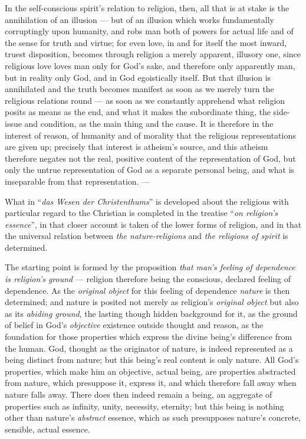 \documentclass[12pt,a4paper]{book}
\begin{document}
In the self-conscious spirit's relation to religion, then, all that is at
stake is the annihilation of an illusion --- but of an illusion which works
fundamentally corruptingly upon humanity, and robs man both of powers for
actual life and of the sense for truth and virtue; for even love, in and for
itself the most inward, truest disposition, becomes through religion a merely
apparent, illusory one, since religious love loves man only for God's sake,
and therefore only apparently man, but in reality only God, and in God
egoistically itself. But that illusion is annihilated and the truth becomes
manifest as soon as we merely turn the religious relations round --- as soon
as we constantly apprehend what religion posits as means as the end, and what
it makes the subordinate thing, the side-issue and condition, as the main
thing and the cause.
It is therefore in the interest of reason, of humanity and of morality that
the religious representations are given up; precisely that interest is
atheism's source, and this atheism therefore negates not the real, positive
content of the representation of God, but only the untrue representation of
God as a separate personal being, and what is inseparable from that
representation. ---

What in ``\emph{das Wesen der Christenthums}'' is
developed about the religious with particular regard to the Christian is
completed in the treatise ``\emph{on religion's essence}'', in that closer
account is taken of the lower forms of religion, and in that the universal
relation between \emph{the nature-religions} and \emph{the religions of
spirit} is determined.

The starting point is formed by the proposition \emph{that man's feeling of
dependence is religion's ground} --- religion therefore being the conscious,
declared feeling of dependence. As the \emph{original object} for this feeling
of dependence \emph{nature} is then determined; and nature is posited not
merely as religion's \emph{original object} but also as its \emph{abiding
ground}, the lasting though hidden background for it, as the ground of belief
in God's \emph{objective} existence outside thought and reason, as the
foundation for those properties which express the divine being's difference
from the human. God, thought as the originator of nature, is indeed
represented as a being distinct from nature; but this being's real content is
only nature. All God's properties, which make him an objective, actual being,
are properties abstracted from nature, which presuppose it, express it, and
which therefore fall away when nature falls away. There does then indeed
remain a being, an aggregate of properties such as infinity, unity, necessity,
eternity; but this being is nothing other than nature's \emph{abstract}
essence, which as such presupposes nature's concrete, sensible, actual
essence.
\end{document}
